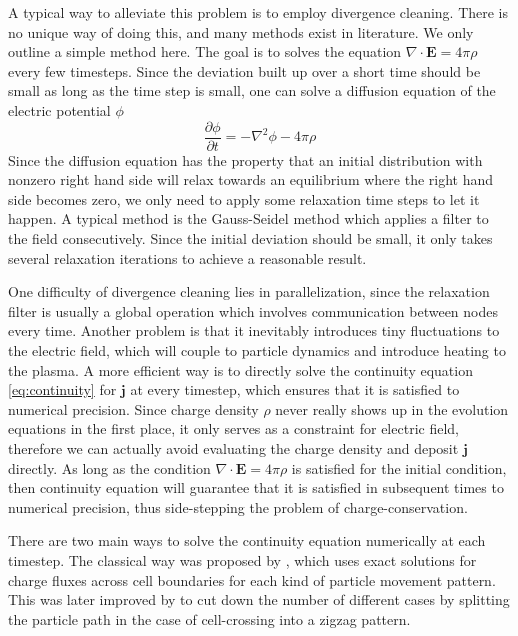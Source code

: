 A typical way to alleviate this problem is to employ divergence
cleaning. There is no unique way of doing this, and many methods exist in
literature.  %
We only outline a simple method here. The goal is to solves the equation
$\nabla\cdot \mathbf{E} = 4\pi\rho$ every few timesteps. Since the deviation
built up over a short time should be small as long as the time step is small,
one can solve a diffusion equation of the electric potential $\phi$
\begin{equation}
  \label{eq:diffusion-electric-potential}
  \frac{\partial\phi}{\partial t} = -\nabla^2\phi - 4\pi\rho
\end{equation}
Since the diffusion equation has the property that an initial distribution with
nonzero right hand side will relax towards an equilibrium where the right hand
side becomes zero, we only need to apply some relaxation time steps to let it
happen. A typical method is the Gauss-Seidel method \citep[see
e.g.][]{press_numerical_2007} which applies a filter to the field consecutively.
Since the initial deviation should be small, it only takes several relaxation
iterations to achieve a reasonable result.

One difficulty of divergence cleaning lies in parallelization, since the
relaxation filter is usually a global operation which involves communication
between nodes every time. Another problem is that it inevitably introduces tiny
fluctuations to the electric field, which will couple to particle dynamics and
introduce heating to the plasma. A more efficient way is to directly solve the
continuity equation \eqref{eq:continuity} for $\mathbf{j}$ at every timestep,
which ensures that it is satisfied to numerical precision. Since charge density
$\rho$ never really shows up in the evolution equations in the first place, it
only serves as a constraint for electric field, therefore we can actually avoid
evaluating the charge density and deposit $\mathbf{j}$ directly.
As long as the condition $\nabla\cdot \mathbf{E} = 4\pi\rho$ is satisfied for
the initial condition, then continuity equation will guarantee that it is
satisfied in subsequent times to numerical precision, thus side-stepping the
problem of charge-conservation.

There are two main ways to solve the continuity equation numerically at each
timestep. The classical way was proposed by \citet{villasenor_rigorous_1992},
which uses exact solutions for charge fluxes across cell boundaries for each
kind of particle movement pattern. This was later improved by
\citet{umeda_new_2003} to cut down the number of different cases by splitting the
particle path in the case of cell-crossing into a zigzag pattern. %

